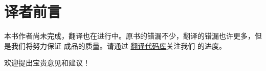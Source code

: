 \chapter*{译者前言}

本书作者尚未完成，翻译也在进行中。原书的错漏不少，翻译的错漏也许更多，但是我们将努力保证
成品的质量。请通过 \href{https://github.com/gastlygem/lcthw-cn}{翻译代码库}关注我们
的进度。

欢迎提出宝贵意见和建议！
